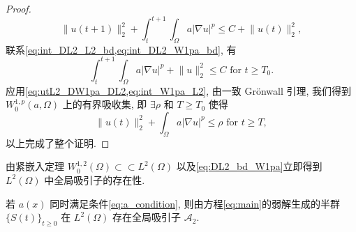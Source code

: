 \documentclass[oneside,longtitle]{LZUthesis}
\numberwithin{equation}{chapter}
\newcommand*\abs[1]{\lvert#1\rvert}
\newcommand*\norm[1]{\lVert#1\rVert}
\newcommand*\Brace[1]{\lbrace#1\rbrace}
\begin{document}
\begin{proof}
\begin{equation}
		\norm{u(t+1)}_2^2
		+ \int_t^{t+1}\int_{\Omega}a \abs{\nabla u}^p
		\leq C + \norm{u(t)}_2^2,
	\end{equation}
	联系\cref{eq:int_DL2_L2_bd,eq:int_DL2_W1pa_bd}, 有
	\begin{equation}\label{eq:int_W1pa_L2}
		\int_t^{t+1}\int_{\Omega}a \abs{\nabla u}^p
		+ \norm{u}_2^2 \leq C \text{ for } t \geq T_0.
	\end{equation}
	应用\cref{eq:utL2_DW1pa_DL2,eq:int_W1pa_L2}, 由一致 Gr\"onwall 引理, 我们得到 $W_0^{1,p}(a,\Omega)$ 上的有界吸收集,
	即 $\exists \rho$ 和 $T \geq T_{0}$ 使得
	\begin{equation}\label{eq:uL2_W1pa_bd}
		\norm{u(t)}_2^2 + \int_{\Omega}a\abs{\nabla u}^p \leq \rho \text{ for } t \geq T,
	\end{equation}
	以上完成了整个证明.
\end{proof}
由紧嵌入定理
$W_0^{1,2}(\Omega) \subset\subset L^2(\Omega)$
以及\cref{eq:DL2_bd_W1pa}立即得到 $L^2(\Omega)$ 中全局吸引子的存在性.
\begin{theorem}\label{thm:attractor_L2}
	若 $a(x)$ 同时满足条件\eqref{eq:a_condition},
	则由方程\eqref{eq:main}的弱解生成的半群 $\Brace{S(t)}_{t \geq 0}$ 在
	$L^2(\Omega)$ 存在全局吸引子 $\mathcal{A}_2$.
\end{theorem}
\end{document}
